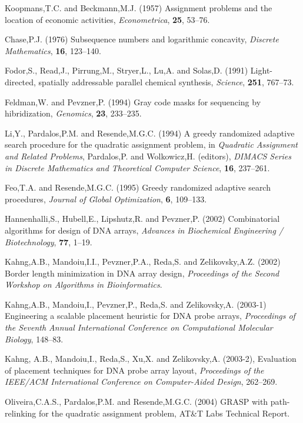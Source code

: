 \documentclass{bioinfo}
\begin{document}
\begin{thebibliography}{}

 Koopmans,T.C. and Beckmann,M.J. (1957) Assignment problems and the location of economic activities, {\it Econometrica}, {\bf 25}, 53--76.

 Chase,P.J. (1976) Subsequence numbers and logarithmic concavity, {\it Discrete Mathematics}, {\bf 16}, 123--140.

 Fodor,S., Read,J., Pirrung,M., Stryer,L., Lu,A. and Solas,D. (1991) Light-directed, spatially addressable parallel chemical synthesis, {\it Science}, {\bf 251}, 767--73.

 Feldman,W. and Pevzner,P. (1994) Gray code masks for sequencing by hibridization, {\it Genomics}, {\bf 23}, 233--235.

 Li,Y., Pardalos,P.M. and Resende,M.G.C. (1994) A greedy randomized adaptive search procedure for the quadratic assignment problem, in {\it Quadratic Assignment and Related Problems}, Pardalos,P. and Wolkowicz,H. (editors), {\it DIMACS Series in Discrete Mathematics and Theoretical Computer Science}, {\bf 16}, 237--261.

 Feo,T.A. and Resende,M.G.C. (1995) Greedy randomized adaptive search procedures, {\it Journal of Global Optimization}, {\bf 6}, 109--133.

 Hannenhalli,S., Hubell,E., Lipshutz,R. and Pevzner,P. (2002) Combinatorial algorithms for design of DNA arrays, {\it Advances in Biochemical Engineering / Biotechnology}, {\bf 77}, 1--19.

 Kahng,A.B., Mandoiu,I.I., Pevzner,P.A., Reda,S. and Zelikovsky,A.Z. (2002) Border length minimization in DNA array design, {\it Proceedings of the Second Workshop on Algorithms in Bioinformatics}.

 Kahng,A.B., Mandoiu,I., Pevzner,P., Reda,S. and Zelikovsky,A. (2003-1) Engineering a scalable placement heuristic for DNA probe arrays, {\it Proceedings of the Seventh Annual International Conference on Computational Molecular Biology}, 148--83.

 Kahng, A.B., Mandoiu,I., Reda,S., Xu,X. and Zelikovsky,A. (2003-2), Evaluation of placement techniques for DNA probe array layout, {\it Proceedings of the IEEE/ACM International Conference on Computer-Aided Design}, 262--269.

 Oliveira,C.A.S., Pardalos,P.M. and Resende,M.G.C. (2004) GRASP with path-relinking for the quadratic assignment problem, AT\&T Labs Technical Report.

\end{thebibliography}
\end{document}
